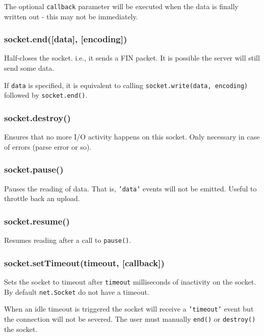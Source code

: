 The optional \texttt{callback} parameter will be executed when the data
is finally written out - this may not be immediately.

\subsubsection{socket.end({[}data{]},
{[}encoding{]})}\label{socket.enddata-encoding}

Half-closes the socket. i.e., it sends a FIN packet. It is possible the
server will still send some data.

If \texttt{data} is specified, it is equivalent to calling
\texttt{socket.write(data, encoding)} followed by \texttt{socket.end()}.

\subsubsection{socket.destroy()}\label{socket.destroy}

Ensures that no more I/O activity happens on this socket. Only necessary
in case of errors (parse error or so).

\subsubsection{socket.pause()}\label{socket.pause}

Pauses the reading of data. That is, \texttt{'data'} events will not be
emitted. Useful to throttle back an upload.

\subsubsection{socket.resume()}\label{socket.resume}

Resumes reading after a call to \texttt{pause()}.

\subsubsection{socket.setTimeout(timeout,
{[}callback{]})}\label{socket.settimeouttimeout-callback}

Sets the socket to timeout after \texttt{timeout} milliseconds of
inactivity on the socket. By default \texttt{net.Socket} do not have a
timeout.

When an idle timeout is triggered the socket will receive a
\texttt{'timeout'} event but the connection will not be severed. The
user must manually \texttt{end()} or \texttt{destroy()} the socket.

